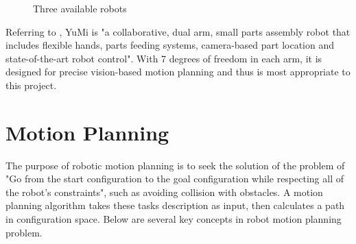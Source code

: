 \begin{figure}[H]
\centering
{}
\caption{Three available robots}
\label{robot}
\end{figure}

Referring to \citep{ABBsDual5:online}, YuMi is "a collaborative, dual arm, small parts assembly robot that includes flexible hands, parts feeding systems, camera-based part location and state-of-the-art robot control". With 7 degrees of freedom in each arm, it is designed for precise vision-based motion planning and thus is most appropriate to this project.

\section{Motion Planning}
The purpose of robotic motion planning is to seek the solution of the problem of "Go from the start configuration to the goal configuration while respecting all of the robot's constraints", such as avoiding collision with obstacles. A motion planning algorithm takes these tasks description as input, then calculates a path in configuration space. Below are several key concepts in robot motion planning problem.

